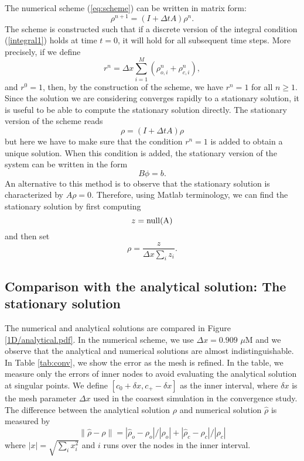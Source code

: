  
The numerical scheme (\ref{eq:scheme}) can be written in matrix form:
\[
\rho^{n+1}=\left(  I+\Delta tA\right)\rho^{n}.%
\]
The scheme is constructed such that if a discrete version of the integral condition (\ref{integral1})
holds at time $t=0$, it will hold for all subsequent time steps. More precisely, if we define
\begin{equation}
r^n=\Delta x\sum_{i=1}^{M}(\rho^n_{o,i}+\rho^n_{c,i}), \label{sum_one}
\end{equation}
and  $r^0=1$, then, by the construction of the scheme, we have $r^n=1$ for all $n\ge 1$.
Since the solution we are considering converges rapidly to a stationary solution, it is useful to be able to compute 
the stationary solution directly. The stationary version of the scheme reads
\[
\rho=\left(  I+\Delta tA\right)\rho %
\]
but here we have to make sure that the condition $r^n=1$ is added to obtain a unique solution. When this condition is added, the stationary version of the system can be written in the form
\[
B\phi=b.
\]
An alternative to this method is to observe that the stationary solution is characterized by $A\rho=0$. Therefore, using Matlab terminology, we can find the stationary solution by first computing 
\[
z=\rm{null}(A)
\]
and then set
\[
\rho=\frac{z}{\Delta x \sum_i z_i}.
\]



\subsection{Comparison with the analytical solution: The stationary solution}

The numerical and analytical solutions are compared in Figure \ref{1D/analytical.pdf}. In the numerical
scheme, we use $\Delta x = 0.909$ $\mu$M and we observe that the analytical and numerical solutions are almost indistinguishable. In Table \ref{tab:conv}, 
we show the error as the mesh is refined. In the table, we measure only the errors of inner nodes to avoid evaluating 
the analytical solution at singular points. We define $[c_0+\delta x,c_+-\delta x]$ as the inner interval, where $\delta x$ is the mesh parameter $\Delta x$ used in the coarsest simulation in the convergence study.  The difference between
the analytical solution $\rho$ and 
numerical solution $\hat{\rho}$ is measured by
\begin{equation}
 \| \hat{\rho}-\rho\|= |\hat{\rho}_o-\rho_o|/|\rho_o|+ |\hat{\rho}_c-\rho_c|/|\rho_c| \label{norm}
\end{equation}
where $|x| = \sqrt{\sum_{i} x_i^2}$ and $i$ runs over the nodes in the inner interval.

